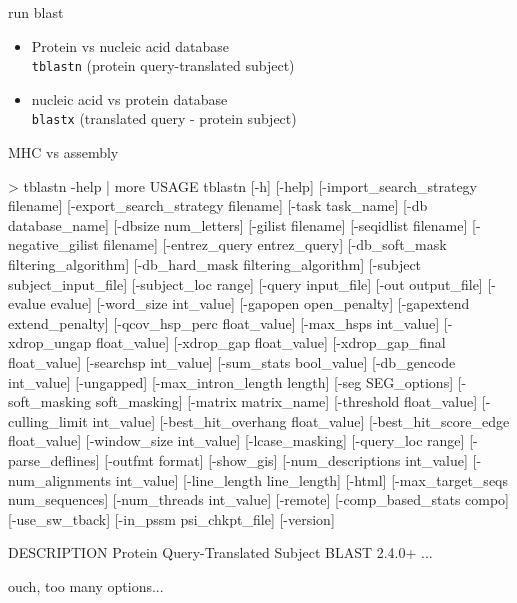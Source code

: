 \documentclass[pdf]{beamer}
\begin{document}
\begin{frame}[fragile]{run blast}
  \begin{itemize}
  \item Protein vs nucleic acid database\\
    \verb|tblastn| (protein query-translated subject)
  \item nucleic acid vs protein database \\
    \verb|blastx| (translated query - protein subject)
  \end{itemize}
\end{frame}

\begin{frame}[fragile]{MHC vs assembly}
  \begin{consolecode}
    > tblastn -help | more
    USAGE
    tblastn [-h] [-help] [-import_search_strategy filename]
    [-export_search_strategy filename] [-task task_name] [-db database_name]
    [-dbsize num_letters] [-gilist filename] [-seqidlist filename]
    [-negative_gilist filename] [-entrez_query entrez_query]
    [-db_soft_mask filtering_algorithm] [-db_hard_mask filtering_algorithm]
    [-subject subject_input_file] [-subject_loc range] [-query input_file]
    [-out output_file] [-evalue evalue] [-word_size int_value]
    [-gapopen open_penalty] [-gapextend extend_penalty]
    [-qcov_hsp_perc float_value] [-max_hsps int_value]
    [-xdrop_ungap float_value] [-xdrop_gap float_value]
    [-xdrop_gap_final float_value] [-searchsp int_value]
    [-sum_stats bool_value] [-db_gencode int_value] [-ungapped]
    [-max_intron_length length] [-seg SEG_options]
    [-soft_masking soft_masking] [-matrix matrix_name]
    [-threshold float_value] [-culling_limit int_value]
    [-best_hit_overhang float_value] [-best_hit_score_edge float_value]
    [-window_size int_value] [-lcase_masking] [-query_loc range]
    [-parse_deflines] [-outfmt format] [-show_gis]
    [-num_descriptions int_value] [-num_alignments int_value]
    [-line_length line_length] [-html] [-max_target_seqs num_sequences]
    [-num_threads int_value] [-remote] [-comp_based_stats compo]
    [-use_sw_tback] [-in_pssm psi_chkpt_file] [-version]

    DESCRIPTION
    Protein Query-Translated Subject BLAST 2.4.0+
    ...
  \end{consolecode}
  
  ouch, too many options... 
\end{frame}
\end{document}
